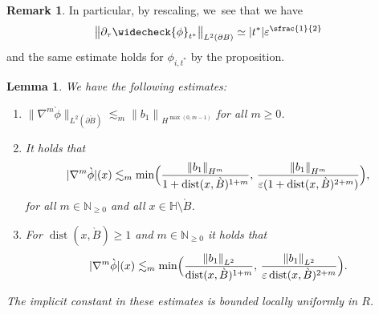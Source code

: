 \documentclass[JEP,XML,SOM,Unicode,published]{cedram}
\let\epsilon\varepsilon
\let\backslash\setminus
\newtheorem{lemma}[theorem]{Lemma}
\theoremstyle{definition}
\newtheorem{remark}[theorem]{Remark}
\DeclareMathOperator{\dist}{dist}
\newcommand\N{\mathbb{N}}
\newcommand\norm[1]{\left\lVert #1\right\rVert}
\newcommand\bnorm[1]{\bigl\lVert #1\bigr\rVert}
\let\chek\widecheck
\let\de\partial
\let\eps\epsilon
\begin{document}
\begin{remark}
In particular, by rescaling, we~see that we have
\begin{align*}
\bnorm{\de_\tau\chek{\phi}_{t^*}}_{L^2(\de B)}\simeq |t^*|\eps^{\sfrac{1}{2}}
\end{align*}
and the same estimate holds for $\phi_{i,t^*}$ by the proposition.
\end{remark}

\begin{lemma}\label{Lem:Decay1}
We have the following estimates:
\begin{enumerate}
\item\label{Lem:Decay1a}
$\bnorm{\nabla^m\grave{\phi}}_{L^2(\de\grave{B})}\lesssim_m \norm{b_1}_{H^{\max(0,m-1)}}$ for all $m\geq 0$.
\item\label{Lem:Decay1b}
It holds that
\begin{align*}
|\nabla^m\grave{\phi}|(x)\lesssim_m \min\Bigl(\frac{\norm{b_1}_{H^{m}}}{1+\dist(x,\grave{B})^{1+m}},\,\frac{\norm{b_1}_{H^{m}}}{\eps(1+\dist(x,\grave{B})^{2+m})}\Bigr),%
\end{align*}
for all $m\in \N_{\geq 0}$ and all $x\in \mathbb{H}\backslash \grave{B}$.
\item\label{Lem:Decay1c}
For $\dist(x,\grave{B})\geq 1$ and $m\in\N_{\geq 0}$ it holds that
\begin{align*}
|\nabla^m\grave{\phi}|(x)\lesssim_m \min\Bigl(\frac{\norm{b_1}_{L^2}}{\dist(x,\grave{B})^{1+m}},\,\frac{\norm{b_1}_{L^2}}{\eps\dist(x,\grave{B})^{2+m}}\Bigr).
\end{align*}
\end{enumerate}
The implicit constant in these estimates is bounded locally uniformly in $R$.
\end{lemma}
\end{document}
